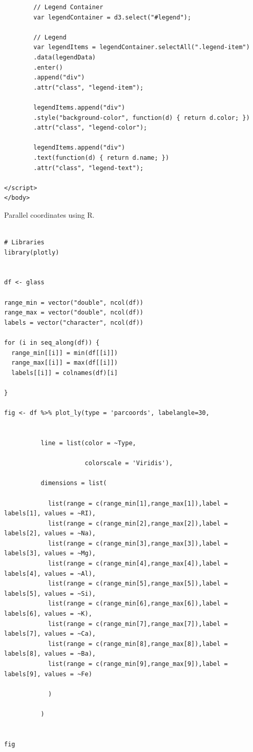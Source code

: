 \documentclass{article}
\begin{document}
\begin{lstlisting}
        // Legend Container
        var legendContainer = d3.select("#legend");
        
        // Legend
        var legendItems = legendContainer.selectAll(".legend-item")
        .data(legendData)
        .enter()
        .append("div")
        .attr("class", "legend-item");
        
        legendItems.append("div")
        .style("background-color", function(d) { return d.color; })
        .attr("class", "legend-color");
        
        legendItems.append("div")
        .text(function(d) { return d.name; })
        .attr("class", "legend-text");

</script>
</body>

\end{lstlisting}

Parallel coordinates using R.

\begin{lstlisting}

# Libraries
library(plotly)


df <- glass

range_min = vector("double", ncol(df))
range_max = vector("double", ncol(df))
labels = vector("character", ncol(df))

for (i in seq_along(df)) {
  range_min[[i]] = min(df[[i]])
  range_max[[i]] = max(df[[i]])
  labels[[i]] = colnames(df)[i]
  
}

fig <- df %>% plot_ly(type = 'parcoords', labelangle=30,
                      

          line = list(color = ~Type,

                      colorscale = 'Viridis'),

          dimensions = list(

            list(range = c(range_min[1],range_max[1]),label = labels[1], values = ~RI),
            list(range = c(range_min[2],range_max[2]),label = labels[2], values = ~Na),
            list(range = c(range_min[3],range_max[3]),label = labels[3], values = ~Mg),
            list(range = c(range_min[4],range_max[4]),label = labels[4], values = ~Al),
            list(range = c(range_min[5],range_max[5]),label = labels[5], values = ~Si),
            list(range = c(range_min[6],range_max[6]),label = labels[6], values = ~K),
            list(range = c(range_min[7],range_max[7]),label = labels[7], values = ~Ca),
            list(range = c(range_min[8],range_max[8]),label = labels[8], values = ~Ba),
            list(range = c(range_min[9],range_max[9]),label = labels[9], values = ~Fe)

            )

          )


fig

\end{lstlisting}
\end{document}
